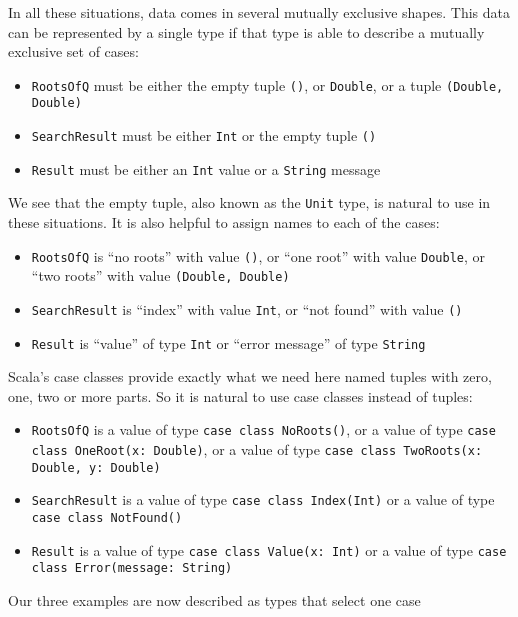 In all these situations, data comes in several mutually exclusive
shapes. This data can be represented by a single type if that type
is able to describe a mutually exclusive set of cases:
\begin{itemize}
\item \lstinline!RootsOfQ! must be either the empty tuple \lstinline!()!,
or \lstinline!Double!, or a tuple \lstinline!(Double, Double)!
\item \lstinline!SearchResult! must be either \lstinline!Int! or the empty
tuple \lstinline!()!
\item \lstinline!Result! must be either an \lstinline!Int! value or a
\lstinline!String! message
\end{itemize}
We see that the empty tuple, also known as the \lstinline!Unit! type,
is natural to use in these situations. It is also helpful to assign
names to each of the cases:
\begin{itemize}
\item \lstinline!RootsOfQ! is \textsf{``}no roots\textsf{''} with value \lstinline!()!,
or \textsf{``}one root\textsf{''} with value \lstinline!Double!, or \textsf{``}two roots\textsf{''}
with value \lstinline!(Double, Double)!
\item \lstinline!SearchResult! is \textsf{``}index\textsf{''} with value \lstinline!Int!,
or \textsf{``}not found\textsf{''} with value \lstinline!()!
\item \lstinline!Result! is \textsf{``}value\textsf{''} of type \lstinline!Int! or \textsf{``}error
message\textsf{''} of type \lstinline!String!
\end{itemize}
Scala\textsf{'}s case classes provide exactly what we need here \textemdash{}
named tuples with zero, one, two or more parts. So it is natural to
use case classes instead of tuples:
\begin{itemize}
\item \lstinline!RootsOfQ! is a value of type \lstinline!case class NoRoots()!,
or a value of type \lstinline!case class OneRoot(x: Double)!, or
a value of type \lstinline!case class TwoRoots(x: Double, y: Double)!
\item \lstinline!SearchResult! is a value of type \lstinline!case class Index(Int)!
or a value of type \lstinline!case class NotFound()!
\item \lstinline!Result! is a value of type \lstinline!case class Value(x: Int)!
or a value of type \lstinline!case class Error(message: String)!
\end{itemize}
Our three examples are now described as types that select one case
